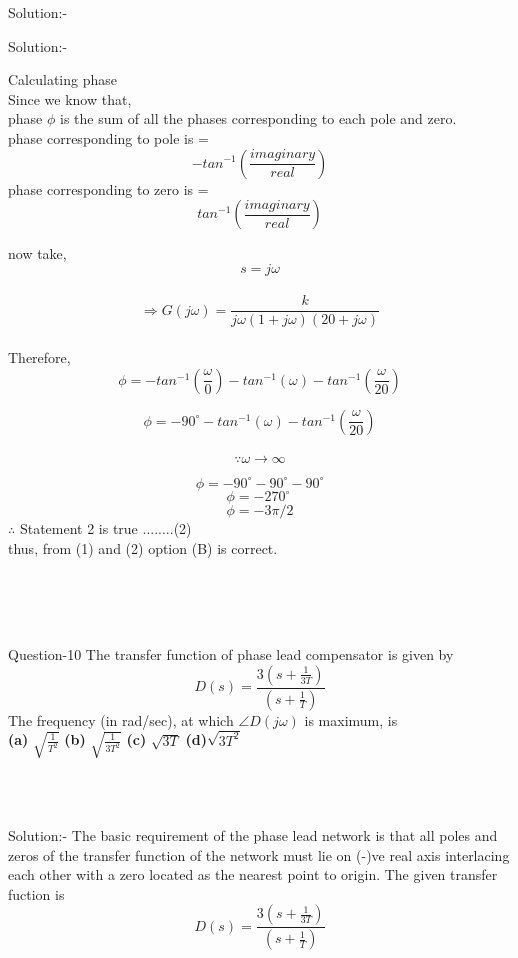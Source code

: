 \documentclass[journal,12pt,twocolumn]{IEEEtran}
\begin{document}
\begin{frame}{Solution:- }
\begin{frame}{Solution:- }
\end{frame}



\begin{frame}{}
Calculating phase\\
Since we know that,\\
phase $ \phi $ is the sum of all the phases corresponding to each pole and zero.\\
phase corresponding to pole is = \[ - tan^{-1}( \frac{imaginary}{real}) \]
phase corresponding to zero is = \[tan^{-1}( \frac{imaginary}{real})\]

\end{frame}



now take,\[  s = j\omega  \]\\

 \[ \Rightarrow  G(j\omega) =  \frac{k}{j\omega(1+j\omega)(20+j\omega)}\]
 \\
Therefore, \\
 \[  \phi =  -tan^{-1}( {\frac{\omega}{0}}) - tan^{-1}(\omega) - tan^{-1}( \frac{\omega}{20})\]

  \[ \phi =  - 90^\circ - tan^{-1}(\omega) - tan^{-1}( \frac{\omega}{20})\]
  \\
  \[\because \omega \to \infty\] 


 
 \begin{frame}{}
  \[ \phi =   - 90^\circ - 90^\circ - 90^\circ\]
 \[\phi = -270^\circ\ \]
 \[\phi = -3\pi/2 \] 
\quad \quad \quad $\therefore$ Statement 2 is true \quad \quad \quad \quad ........(2)\\
 thus, from (1) and (2) option (B) is correct.
\end{frame}
\\\\\\
\begin{frame}{Question-10 }
The transfer function of phase lead compensator is given by $$D(s) = \frac{3(s+\frac{1}{3T})}{(s+\frac{1}{T})}$$ 
The frequency (in rad/sec), at which $\angle D(j\omega)$ is maximum, is \\
\setlength{\lineskip}{1em}
\textbf{(a)} $\sqrt{\frac{1}{T^2}}$ \;\;\;\;\;\; \textbf{(b)} $\sqrt{\frac{1}{3T^2}}$ \;\;\;\;\;\; \textbf{(c)} $\sqrt{3T}$ \;\;\;\;\;\; \textbf{(d)}$\sqrt{3T^2}$
\end{frame}
\\\\
\begin{frame}{Solution:- }
 The basic requirement of the phase lead network is that all poles and zeros of the transfer function of the network must lie on (-)ve real axis interlacing each other with a zero located as the nearest point to origin.
   \newline
   \newline
 The given transfer fuction is $$D(s) = \frac{3(s+\frac{1}{3T})}{(s+\frac{1}{T})}$$
\end{frame}


\end{frame}
\end{document}
